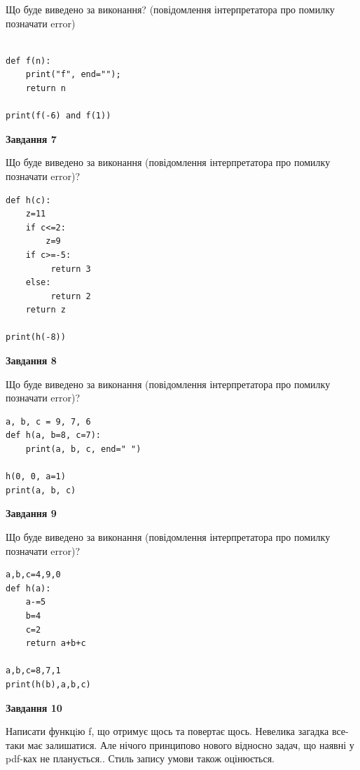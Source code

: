 \documentclass[12pt, ukrainian]{article}
\begin{document}
{\begin {large}
Що буде виведено за виконання? (повідомлення інтерпретатора про помилку позначати error)\par
\begin{verbatim}

def f(n):
    print("f", end="");
    return n

print(f(-6) and f(1))
\end{verbatim}

{\begin {center}\textbf{Завдання 7}\end {center}}

Що буде виведено за виконання (повідомлення інтерпретатора про помилку позначати error)?\par
\begin{verbatim}
def h(c):
    z=11
    if c<=2: 
        z=9
    if c>=-5:
         return 3
    else:
         return 2
    return z

print(h(-8))
\end{verbatim}

{\begin {center}\textbf{Завдання 8}\end {center}}

Що буде виведено за виконання (повідомлення інтерпретатора про помилку позначати error)?\par
\begin{verbatim}
a, b, c = 9, 7, 6
def h(a, b=8, c=7):
    print(a, b, c, end=" ")

h(0, 0, a=1)
print(a, b, c)
\end{verbatim}

{\begin {center}\textbf{Завдання 9}\end {center}}

Що буде виведено за виконання (повідомлення інтерпретатора про помилку позначати error)?\par
\begin{verbatim}
a,b,c=4,9,0
def h(a):
    a-=5
    b=4
    c=2
    return a+b+c

a,b,c=8,7,1
print(h(b),a,b,c)
\end{verbatim}

{\begin {center}\textbf{Завдання 10}\end {center}}


Написати функцiю f, що отримує щось та повертає щось. Невелика загадка все-таки має залишатися. Але нічого принципово нового відносно задач, що наявні у pdf-ках не планується.. Стиль запису умови також оцінюється.\par
\end {large}}
\newpage
\end{document}
